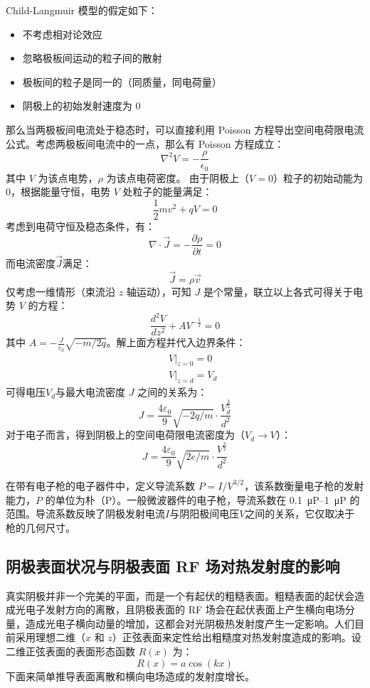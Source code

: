 	Child-Langmuir 模型的假定如下：
	\begin{itemize}
	\item 不考虑相对论效应
	\item 忽略极板间运动的粒子间的散射
	\item 极板间的粒子是同一的（同质量，同电荷量）
	\item 阴极上的初始发射速度为 0
	\end{itemize}
	那么当两极板间电流处于稳态时，可以直接利用 Poisson 方程导出空间电荷限电流公式。考虑两极板间电流中的一点，那么有 Poisson 方程成立：
	\[\nabla^2V=-\frac{\rho}{\epsilon_0}\]
	其中 $V$ 为该点电势，$\rho$ 为该点电荷密度。
	由于阴极上（$V=0$）粒子的初始动能为 0，根据能量守恒，电势 $V$ 处粒子的能量满足：
	\[\frac{1}{2}mv^2+qV=0\]
	考虑到电荷守恒及稳态条件，有：
	\[\nabla\cdot\vec{J}=-\frac{\partial \rho}{\partial t}= 0\]
	而电流密度$\vec{J}$满足：
	\[\vec{J}=\rho \vec{v}\]
	仅考虑一维情形（束流沿 $z$ 轴运动），可知 $J$ 是个常量，联立以上各式可得关于电势 $V$ 的方程：
	\[\frac{d^2V}{dz^2}+AV^{-\frac{1}{2}}=0\]
	其中 $A=-\frac{J}{\varepsilon_0}\sqrt{-m/2q}$。解上面方程并代入边界条件：
	\begin{eqnarray*}
	&&V|_{z=0}=0\\
	&&V|_{z=d}=V_d
	\end{eqnarray*}
	可得电压$V_d$与最大电流密度 $J$ 之间的关系为：
	\[J = \frac{4\varepsilon_0}{9}\sqrt{-2q/m}\cdot \frac{V_d^{\frac{3}{2}}}{d^2}\]
	对于电子而言，得到阴极上的空间电荷限电流密度为（$V_d\rightarrow V$）：
	\begin{equation}
	J = \frac{4\varepsilon_0}{9}\sqrt{2e/m}\cdot \frac{V^{\frac{3}{2}}}{d^2}
	\end{equation}

	在带有电子枪的电子器件中，定义导流系数 $P=I/V^{3/2}$，该系数衡量电子枪的发射能力，$P$ 的单位为朴（P）。一般微波器件的电子枪，导流系数在 \SIrange[range-phrase = --]{0.1}{1}{\micro P} 的范围。导流系数反映了阴极发射电流$I$与阴阳极间电压$V$之间的关系，它仅取决于枪的几何尺寸。

\subsection{阴极表面状况与阴极表面 RF 场对热发射度的影响}
真实阴极并非一个完美的平面，而是一个有起伏的粗糙表面。粗糙表面的起伏会造成光电子发射方向的离散，且阴极表面的 RF 场会在起伏表面上产生横向电场分量，造成光电子横向动量的增加，这都会对光阴极热发射度产生一定影响。人们目前采用理想二维（$x$ 和 $z$）正弦表面来定性给出粗糙度对热发射度造成的影响。设二维正弦表面的表面形态函数 $R(x)$ 为：
\[
	R(x) = a\cos(kx)
\]
下面来简单推导表面离散和横向电场造成的发射度增长。
